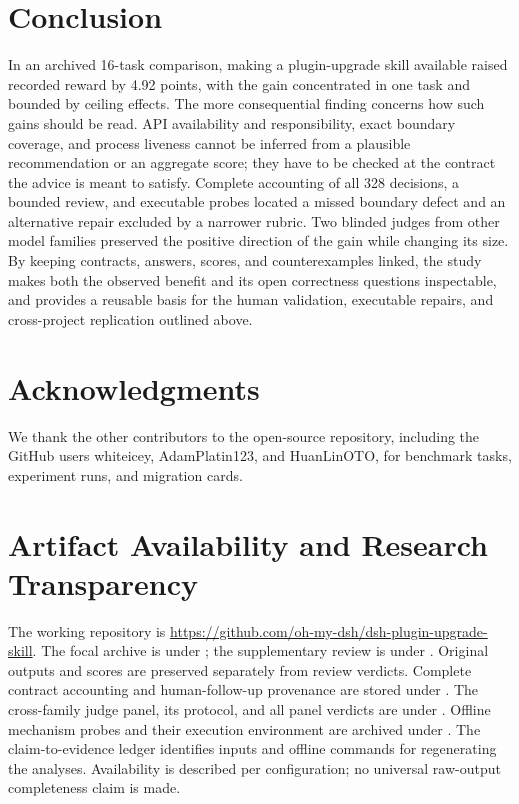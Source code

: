 \documentclass[11pt]{article}
\begin{document}
\section{Conclusion}
In an archived 16-task comparison, making a plugin-upgrade skill available raised recorded reward by 4.92 points, with the gain concentrated in one task and bounded by ceiling effects. The more consequential finding concerns how such gains should be read. API availability and responsibility, exact boundary coverage, and process liveness cannot be inferred from a plausible recommendation or an aggregate score; they have to be checked at the contract the advice is meant to satisfy. Complete accounting of all 328 decisions, a bounded review, and executable probes located a missed boundary defect and an alternative repair excluded by a narrower rubric. Two blinded judges from other model families preserved the positive direction of the gain while changing its size. By keeping contracts, answers, scores, and counterexamples linked, the study makes both the observed benefit and its open correctness questions inspectable, and provides a reusable basis for the human validation, executable repairs, and cross-project replication outlined above.

\section*{Acknowledgments}
We thank the other contributors to the open-source repository, including the GitHub users whiteicey, AdamPlatin123, and HuanLinOTO, for benchmark tasks, experiment runs, and migration cards.

\section*{Artifact Availability and Research Transparency}
The working repository is \url{https://github.com/oh-my-dsh/dsh-plugin-upgrade-skill}. The focal archive is under ; the supplementary review is under . Original outputs and scores are preserved separately from review verdicts. Complete contract accounting and human-follow-up provenance are stored under . The cross-family judge panel, its protocol, and all panel verdicts are under . Offline mechanism probes and their execution environment are archived under . The claim-to-evidence ledger identifies inputs and offline commands for regenerating the analyses. Availability is described per configuration; no universal raw-output completeness claim is made.
\end{document}
